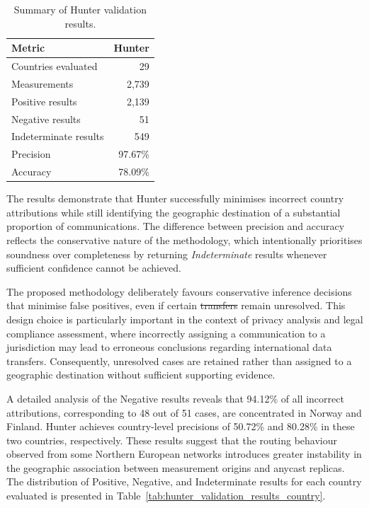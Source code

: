 \documentclass[
A4paper,                %
twoside,                %
openright,              %
chapterprefix=true,     %
12pt,                   %
headings=normal,        %
titlepage=on            %
]{book}
\makeatletter
\providecommand{\DIFaddtex}[1]{{\protect\color{blue}\uwave{#1}}} %
\providecommand{\DIFdeltex}[1]{{\protect\color{red}\sout{#1}}} %
\providecommand{\DIFaddbegin}{} %
\providecommand{\DIFaddend}{} %
\providecommand{\DIFdelbegin}{} %
\providecommand{\DIFdelend}{} %
\providecommand{\DIFadd}[1]{\texorpdfstring{\DIFaddtex{#1}}{#1}} %
\providecommand{\DIFdel}[1]{\texorpdfstring{\DIFdeltex{#1}}{}} %
\providecommand{\DIFscaledelfig}{0.5}
\newlength{\DIFdelgraphicswidth} %
\newlength{\DIFdelgraphicsheight} %
\providecommand{\DIFaddincludegraphics}[2][]{{\color{blue}\fbox{\DIFOincludegraphics[#1]{#2}}}} %
\providecommand{\DIFdelincludegraphics}[2][]{%
\sbox{\DIFdelgraphicsbox}{\DIFOincludegraphics[#1]{#2}}%
\settoboxwidth{\DIFdelgraphicswidth}{\DIFdelgraphicsbox} %
\settoboxtotalheight{\DIFdelgraphicsheight}{\DIFdelgraphicsbox} %
\scalebox{\DIFscaledelfig}{%
\parbox[b]{\DIFdelgraphicswidth}{\usebox{\DIFdelgraphicsbox}\\[-\baselineskip] \rule{\DIFdelgraphicswidth}{0em}}\llap{\resizebox{\DIFdelgraphicswidth}{\DIFdelgraphicsheight}{%
\setlength{\unitlength}{\DIFdelgraphicswidth}%
\begin{picture}(1,1)%
\thicklines\linethickness{2pt} %
{\color[rgb]{1,0,0}\put(0,0){\framebox(1,1){}}}%
{\color[rgb]{1,0,0}\put(0,0){\line( 1,1){1}}}%
{\color[rgb]{1,0,0}\put(0,1){\line(1,-1){1}}}%
\end{picture}%
}\hspace*{3pt}}} %
} %
\DeclareRobustCommand{\DIFaddbegin}{\DIFOaddbegin \let\includegraphics\DIFaddincludegraphics} %
\DeclareRobustCommand{\DIFaddend}{\DIFOaddend \let\includegraphics\DIFOincludegraphics} %
\DeclareRobustCommand{\DIFdelbegin}{\DIFOdelbegin \let\includegraphics\DIFdelincludegraphics} %
\DeclareRobustCommand{\DIFdelend}{\DIFOaddend \let\includegraphics\DIFOincludegraphics} %
\let\sout@orig\sout %
\renewcommand{\sout}[1]{\ifmmode\text{\sout@orig{\ensuremath{#1}}}\else\sout@orig{#1}\fi} %
\makeatother
\begin{document}
\begin{table}[ht]
    \centering
    \small
    \caption{Summary of Hunter validation results.}
    \label{tab:hunter_validation_results}
    \begin{tabular}{lr}
        \toprule
        \textbf{Metric} & \textbf{Hunter} \\
        \midrule
        Countries evaluated & 29 \\
        Measurements & 2,739 \\
        Positive results & 2,139 \\
        Negative results & 51 \\
        Indeterminate results & 549 \\
        Precision & 97.67\% \\
        Accuracy & 78.09\% \\
        \bottomrule
    \end{tabular}
\end{table}


The results demonstrate that Hunter successfully minimises incorrect country attributions while still identifying the geographic destination of a substantial proportion of communications. The difference between precision and accuracy reflects the conservative nature of the methodology, which intentionally prioritises soundness over completeness by returning \textit{Indeterminate} results whenever sufficient confidence cannot be achieved.

The proposed methodology deliberately favours conservative inference decisions that minimise false positives, even if certain \DIFdelbegin \DIFdel{transfers }\DIFdelend \DIFaddbegin \DIFadd{communications }\DIFaddend remain unresolved. This design choice is particularly important in the context of privacy analysis and legal compliance assessment, where incorrectly assigning a communication to a jurisdiction may lead to erroneous conclusions regarding international data transfers. Consequently, unresolved cases are retained rather than assigned to a geographic destination without sufficient supporting evidence.

A detailed analysis of the Negative results reveals that 94.12\% of all incorrect attributions, corresponding to 48 out of 51 cases, are concentrated in Norway and Finland. Hunter achieves country-level precisions of 50.72\% and 80.28\% in these two countries, respectively. These results suggest that the routing behaviour observed from some Northern European networks introduces greater instability in the geographic association between measurement origins and anycast replicas. The distribution of Positive, Negative, and Indeterminate results for each country evaluated is presented in Table~\ref{tab:hunter_validation_results_country}.
\end{document}
